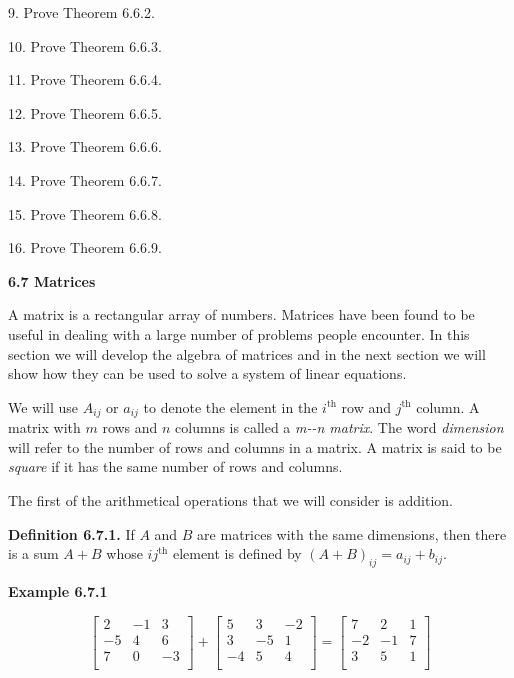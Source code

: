 9. Prove Theorem 6.6.2. \nl

10. Prove Theorem 6.6.3.\nl

11. Prove Theorem 6.6.4. \nl

12. Prove Theorem 6.6.5. \nl

13. Prove Theorem 6.6.6. \nl

14. Prove Theorem 6.6.7. \nl

15. Prove Theorem 6.6.8. \nl

16. Prove Theorem 6.6.9. \nl

\newpage
\textbf{6.7 Matrices}\nl

A matrix is a rectangular array of numbers.  Matrices have been found to be useful in dealing with a large number of problems people encounter.  In this section we will develop the algebra of matrices and in the next section we will show how they can be used to solve a system of linear equations.\nl

We will use $A_{ij}$ or $a_{ij}$ to denote the element in the $i^{\text{th}}$ row and $j^{\text{th}}$ column.  A matrix with $m$ rows and $n$ columns is called a \textit{m--n matrix}.  The word \textit{dimension}
will refer to the number of rows and columns in a matrix.  A matrix is said to be \textit{square} if it has the same number of rows and columns.  \nl

The first of the arithmetical operations that we will consider is addition. \nl

\textbf{Definition 6.7.1.}  If $A$ and $B$ are matrices with the same dimensions, then there is a sum $A + B$ whose $ij^{\text{th}}$ element is defined by $(A + B)_{ij} = a_{ij} + b_{ij}.$  \nl

\textbf{Example 6.7.1}\nl


\begin{equation*}
\left[
\begin{array}{rrr}
2 & -1 & 3\\
-5&4&6\\
7&0&-3\\
\end{array}
\right] +
\left[
\begin{array}{rrr}
5 & 3 & -2\\
3&-5&1\\
-4&5&4\\
\end{array}
\right]=
\left[
\begin{array}{rrr}
7 & 2 & 1\\
-2&-1&7\\
3&5&1\\
\end{array}
\right]
\end{equation*}\nl

